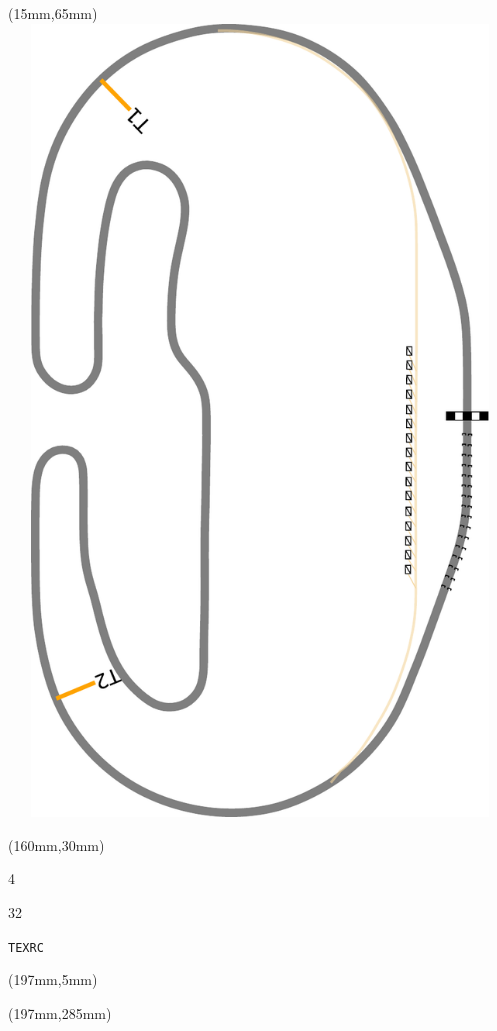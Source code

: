\begin{textblock*}{185mm}(15mm,65mm)%
\centering
\mbox{\includegraphics[width=185mm,height=210mm,keepaspectratio]{PT/TEXRC.pdf}}
\end{textblock*}
\begin{textblock*}{40mm}(160mm,30mm)%
\Large
\par{} 
\par4 
\par32 
\par\hfill\tiny\tt TEXRC\\
\end{textblock*}
\begin{textblock*}{20mm}(197mm,5mm)%
\fbox{\thepage}
\label{TEXRC}
\end{textblock*}
\begin{textblock*}{20mm}(197mm,285mm)%
\fbox{\thepage}
\end{textblock*}

